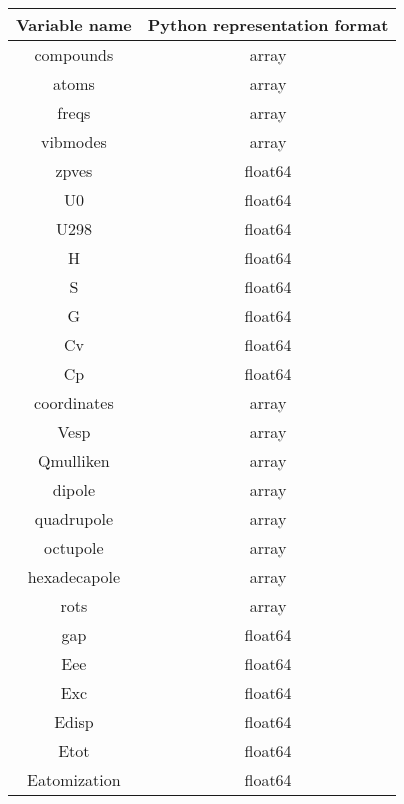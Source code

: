 \documentclass{article}
\begin{document}
\begin{center}
    \begin{tabular}{||c c||} 
        \hline
            Variable name & Python representation format\\
        \hline\hline
        compounds & array \\
        \hline
   atoms & array\\
   \hline
   freqs & array\\
   \hline
   vibmodes & array\\
   \hline
   zpves & float64\\
   \hline
   U0 & float64\\
   \hline
   U298 & float64\\
   \hline
   H & float64\\
   \hline
   S & float64\\
   \hline
   G & float64\\
   \hline
   Cv & float64\\
   \hline
   Cp & float64\\
   \hline
   coordinates & array\\
   \hline
   Vesp & array\\
   \hline
   Qmulliken & array\\
   \hline
   dipole & array\\
   \hline
   quadrupole & array\\
   \hline
   octupole & array\\
   \hline
   hexadecapole & array\\
   \hline
   rots & array\\
   \hline
   gap & float64\\
   \hline
   Eee & float64\\
   \hline
   Exc & float64\\
   \hline
   Edisp & float64\\
   \hline
   Etot & float64\\
   \hline
   Eatomization & float64\\
   \hline

    \end{tabular}
\end{center}
\end{document}
